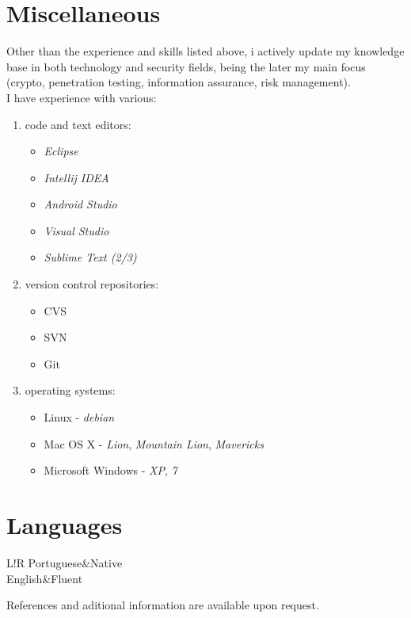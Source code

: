 \documentclass[10pt]{article}
\newcommand\VRule{\color{lightgray}\vrule width 0.5pt}
\newenvironment{listing}{
 \begin{itemize}
  \setlength{\itemsep}{1pt}
  \setlength{\parskip}{0pt}
  \setlength{\parsep}{0pt}
}{\end{itemize}}
\newenvironment{enum}{
 \begin{enumerate}
  \setlength{\itemsep}{1pt}
  \setlength{\parskip}{0pt}
  \setlength{\parsep}{0pt}
}{\end{enumerate}}
\begin{document}
\section*{Miscellaneous}
Other than the experience and skills listed above, i actively update my knowledge base in both technology and security fields, being the later my main focus (crypto, penetration testing, information assurance, risk management).\\
I have experience with various:
\begin{enum}
	\item code and text editors:
	\begin{multicols}{3}
	\begin{listing}
		\item \emph{Eclipse}
		\item \emph{Intellij IDEA}
		\item \emph{Android Studio}
		\item \emph{Visual Studio}
		\item \emph{Sublime Text (2/3)}
	\end{listing} 
	\end{multicols}
	\item version control repositories:
	\begin{multicols}{3}
	\begin{listing}
		\item CVS
		\item SVN
		\item Git
	\end{listing}
	\end{multicols}
	\item operating systems:
	\begin{listing}
		\item Linux - \emph{debian}
		\item Mac OS X - \emph{Lion}, \emph{Mountain Lion}, \emph{Mavericks}
		\item Microsoft Windows - \emph{XP}, \emph{7}
	\end{listing}
\end{enum}

\section*{Languages}
\begin{tabular}{L!{\VRule}R}
Portuguese&Native\\
English&Fluent\\
\end{tabular}
{\vspace{20pt}\newline\newline
\vspace{20pt}
\scriptsize\hfill References and aditional information are available upon request.}
\end{document}
